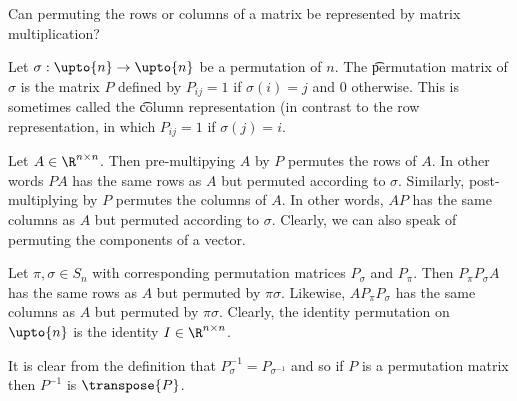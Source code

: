 

Can permuting the rows or columns of a matrix be represented by matrix multiplication?


Let $\sigma: \upto{n} \to \upto{n}$ be a permutation of $n$.
The \t{permutation matrix} of $\sigma$ is the matrix $P$ defined by $P_{ij} = 1$ if $\sigma(i) = j$ and 0 otherwise.
This is sometimes called the \t{column representation} (in contrast to the row representation, in which $P_{ij} = 1$ if $\sigma(j) = i$.

Let $A \in \R^{n \times n}$.
Then pre-multipying $A$ by $P$ permutes the rows of $A$.
In other words $PA$ has the same rows as $A$ but permuted according to $\sigma$.
Similarly, post-multiplying by $P$ permutes the columns of $A$.
In other words, $AP$ has the same columns as $A$ but permuted according to $\sigma$.
Clearly, we can also speak of permuting the components of a vector.


Let $\pi, \sigma \in S_n$ with corresponding permutation matrices $P_\sigma$ and $P_\pi$.
Then $P_{\pi}P_{\sigma}A$ has the same rows as $A$ but permuted by $\pi\sigma$.
Likewise, $AP_{\pi}P_{\sigma}$ has the same columns as $A$ but permuted by $\pi\sigma$.
Clearly, the identity permutation on $\upto{n}$ is the identity $I \in \R^{n \times n}$.


It is clear from the definition that $P_{\sigma}^{-1} = P_{\sigma^{-1}}$ and so if $P$ is a permutation matrix then $P^{-1}$ is $\transpose{P}$.

\blankpage
